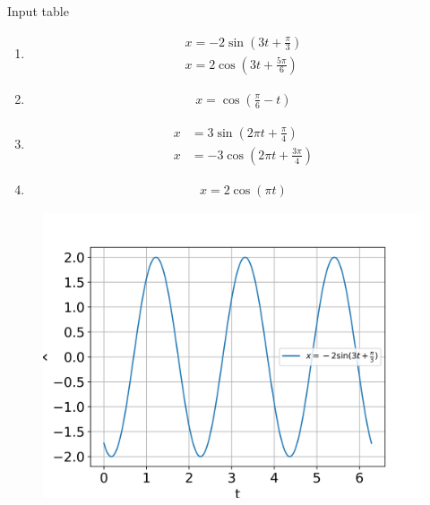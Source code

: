 \documentclass[journal,12pt,twocolumn]{IEEEtran}
\theoremstyle{remark}
\begin{document}
\solution
\fi
\begin{table}[htbp]
    \centering
    \setlength{\extrarowheight}{5pt}
    
    \caption{Input table}
    \label{tab:parameter_table.11.14.12.analog}
\end{table}
\begin{enumerate}[label=\roman*)]
\item \begin{align}
    x = -2 \sin\left(3t + \frac{\pi}{3}\right)\\
   x =2\cos\left(3t+\frac{5\pi}{6}\right)
\end{align}
\begin{figure}[!htbp]
    
\end{figure}
\item \begin{align}
    x = \cos\left(\frac{\pi}{6} - t\right)
\end{align}
\begin{figure}[!htbp]
    
\end{figure}

\item \begin{align}
    x &= 3 \sin\left(2\pi t + \frac{\pi}{4}\right)\\
    x &= -3\cos\left(2\pi t + \frac{3\pi}{4}\right)
\end{align}
\begin{figure}[!htbp]
    
\end{figure}

\item 
\begin{align}
    x = 2 \cos(\pi t)
\end{align}
\begin{figure}[!htbp]
    
\end{figure}

\end{enumerate}

\begin{figure}[ht]
    \centering
    \includegraphics[width = \columnwidth]{ncert-physics/11/14/12/figs/Figure_1.png}
    \caption{}
\end{figure}
\end{document}
